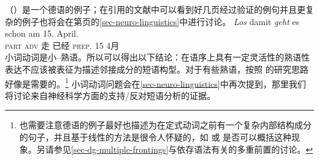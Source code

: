 \begin{exe}
\begin{xlist}[iv.]
\begin{exe}
\begin{xlist}[iv.]
（）是一个德语的例子；在引用的文献中可以看到好几页经过验证的例句并且更复杂的例子也将会在第\pageref{ex-complex-vf}页的\ref{sec-neuro-linguistics}中进行讨论。
\ea\label{bsp-los-damit-zwei}
\gll \emph{Los} damit \emph{geht} es schon am 15. April.\footnotemark\\
      \textsc{part} \textsc{adv} 走 \expl{} 已经 \textsc{prep}. 15 4月\\%
%
\z
小词动词是小--熟语。所以可以得出以下结论：在语序上具有一定灵活性的熟语性表达不应该被表征为描述邻接成分的短语构型。对于有些熟语，按照 的研究思路好像是需要的。\footnote{也需要注意德语的例子最好也描述为在定式动词之前有一个复杂内部结构成分的句子，并且基于线性的方法是很令人怀疑的，如 或 是否可以概括这种现象。另请参见\ref{sec-dg-multiple-frontings}与依存语法有关的多重前置的讨论。
}
小词动词问题会在\ref{sec-neuro-linguistics}中再次提到，那里我们将讨论来自神经科学方面的支持/反对短语分析的证据。


\end{xlist}
\end{exe}
\end{xlist}
\end{exe}
